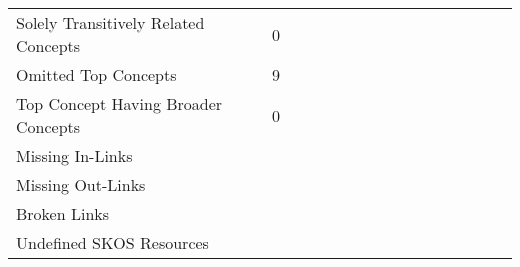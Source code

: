 \begin{table}[h]
\begin{tabular}{p{4cm}ccccccccccccccc}
Solely Transitively Related Concepts & 0 &&&&&&&&&&&&&& \\

Omitted Top Concepts & 9 &&&&&&&&&&&&&& \\

Top Concept Having Broader Concepts & 0 &&&&&&&&&&&&&& \\

\midrule

Missing In-Links &&&&&&&&&&&&&&& \\

Missing Out-Links &&&&&&&&&&&&&&& \\

Broken Links &&&&&&&&&&&&&&& \\


Undefined SKOS Resources &&&&&&&&&&&&&&& \\

\bottomrule
\end{tabular}
\end{table}


% 
